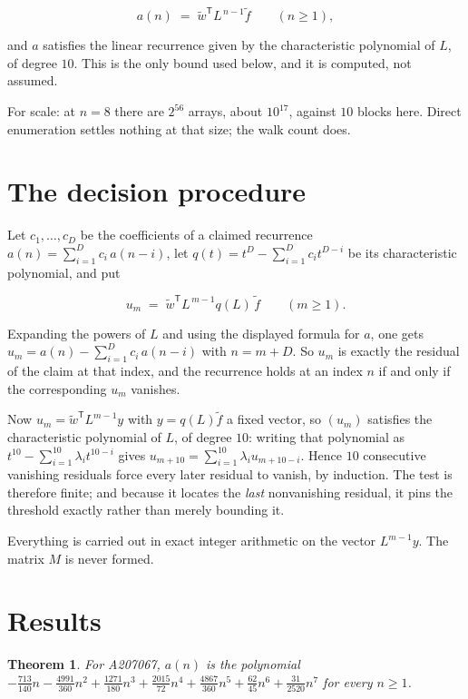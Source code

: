 \documentclass[11pt]{article}
\newtheorem{theorem}{Theorem}
\theoremstyle{definition}
\begin{document}
\[a(n) \;=\; \tilde w^{\mathsf T} L^{\,n-1} \tilde f \qquad (n \ge 1),\]

and $a$ satisfies the linear recurrence given by the characteristic polynomial of $L$, of degree $10$. This is the only bound used below, and it is computed, not assumed.

For scale: at $n = 8$ there are $2^{56}$ arrays, about $10^{17}$, against $10$ blocks here. Direct enumeration settles nothing at that size; the walk count does.

\section{The decision procedure}

Let $c_1,\dots,c_D$ be the coefficients of a claimed recurrence $a(n) = \sum_{i=1}^{D} c_i\,a(n-i)$, let $q(t) = t^{D} - \sum_{i=1}^{D} c_i t^{D-i}$ be its characteristic polynomial, and put

\[u_m \;=\; \tilde w^{\mathsf T} L^{\,m-1} q(L)\,\tilde f \qquad (m \ge 1).\]

Expanding the powers of $L$ and using the displayed formula for $a$, one gets $u_m = a(n) - \sum_{i=1}^{D} c_i\,a(n-i)$ with $n = m + D$. So $u_m$ is exactly the residual of the claim at that index, and the recurrence holds at an index $n$ if and only if the corresponding $u_m$ vanishes.

Now $u_m = \tilde w^{\mathsf T} L^{m-1} y$ with $y = q(L)\tilde f$ a fixed vector, so $(u_m)$ satisfies the characteristic polynomial of $L$, of degree $10$: writing that polynomial as $t^{10} - \sum_{i=1}^{10} \lambda_i t^{10-i}$ gives $u_{m+10} = \sum_{i=1}^{10} \lambda_i u_{m+10-i}$. Hence $10$ consecutive vanishing residuals force every later residual to vanish, by induction. The test is therefore finite; and because it locates the {\itshape last} nonvanishing residual, it pins the threshold exactly rather than merely bounding it.

Everything is carried out in exact integer arithmetic on the vector $L^{m-1}y$. The matrix $M$ is never formed.

\section{Results}

\begin{theorem} For A207067, $a(n)$ is the polynomial $-\frac{713}{140}n - \frac{4991}{360}n^{2} + \frac{1271}{180}n^{3} + \frac{2015}{72}n^{4} + \frac{4867}{360}n^{5} + \frac{62}{45}n^{6} + \frac{31}{2520}n^{7}$ for every $n \ge 1$.\end{theorem}
\end{document}
